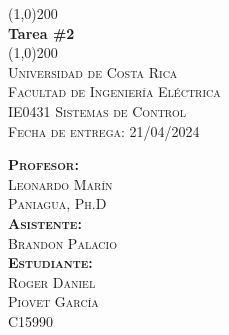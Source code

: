 \begin{titlepage}    
    \begin{center}
        \line(1,0){200}\\
        [5mm]
        \huge{\bfseries Tarea \#2}\\
        \line(1,0){200}\\
        [2.5cm]
        \textsc{\Large Universidad de Costa Rica\\Facultad de Ingeniería Eléctrica\\IE0431 Sistemas de Control}\\
        \textsc{\Large Fecha de entrega: 21/04/2024}\\
        \vspace{2.5cm}
        \begin{flushleft}
            \textsc{\large 
            \textbf{Profesor:}\\ Leonardo Marín\\ Paniagua, Ph.D\\[2mm]
            \textbf{Asistente:}\\ Brandon Palacio\\[2mm]
            \textbf{Estudiante:}\\ Roger Daniel\\Piovet García\\[2mm]C15990\\}
        \end{flushleft}
    \end{center}
\end{titlepage}
\restoregeometry
